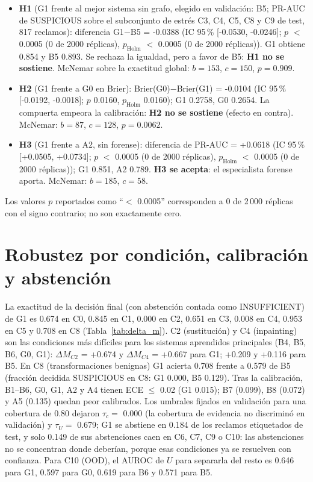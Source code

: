 \begin{itemize}
\item \textbf{H1} (G1 frente al mejor sistema sin grafo, elegido en validación: B5; PR-AUC de SUSPICIOUS sobre el subconjunto de estrés C3, C4, C5, C8 y C9 de test, 817 reclamos): diferencia G1$-$B5 = -0.0388 (IC 95\,\% [-0.0530, -0.0246]; $p$ $<$ 0.0005 (0 de 2000 réplicas), $p_{\mathrm{Holm}}$ $<$ 0.0005 (0 de 2000 réplicas)). G1 obtiene 0.854 y B5
0.893. Se rechaza la igualdad, pero a favor de B5: \textbf{H1 no se sostiene}. McNemar sobre
la exactitud global: $b=153$, $c=150$, $p=0.909$.
\item \textbf{H2} (G1 frente a G0 en Brier): Brier(G0)$-$Brier(G1) = -0.0104 (IC 95\,\% [-0.0192, -0.0018]; $p$ 0.0160, $p_{\mathrm{Holm}}$ 0.0160); G1 0.2758, G0
0.2654. La compuerta empeora la calibración: \textbf{H2 no se sostiene} (efecto en contra). McNemar:
$b=87$, $c=128$, $p=0.0062$.
\item \textbf{H3} (G1 frente a A2, sin forense): diferencia de PR-AUC = +0.0618 (IC 95\,\% [+0.0505, +0.0734]; $p$ $<$ 0.0005 (0 de 2000 réplicas), $p_{\mathrm{Holm}}$ $<$ 0.0005 (0 de 2000 réplicas)); G1 0.851, A2
0.789. \textbf{H3 se acepta}: el especialista forense aporta. McNemar: $b=185$, $c=58$.
\end{itemize}

Los valores $p$ reportados como ``$<$ 0.0005'' corresponden a 0 de 2\,000 réplicas con el signo contrario; no son exactamente cero.

\section{Robustez por condición, calibración y abstención}

La exactitud de la decisión final (con abstención contada como INSUFFICIENT) de G1 es 0.674 en C0,
0.845 en C1, 0.000 en C2, 0.651 en C3, 0.008 en C4,
0.953 en C5 y 0.708 en C8 (Tabla~\ref{tab:delta_m}). C2 (sustitución) y C4 (inpainting) son
las condiciones más difíciles para los sistemas aprendidos principales (B4, B5, B6, G0, G1): $\Delta M_{C2}$ = +0.674 y $\Delta M_{C4}$ = +0.667
para G1; +0.209 y +0.116 para B5. En C8 (transformaciones benignas) G1 acierta
0.708 frente a 0.579 de B5 (fracción decidida SUSPICIOUS en C8: G1
0.000, B5
0.129).
Tras la calibración, B1--B6, G0, G1, A2 y A4 tienen ECE $\leq$ 0.02 (G1 0.015); B7 (0.099), B8 (0.072) y A5 (0.135) quedan peor calibrados. Los umbrales fijados en validación para una cobertura
de 0.80 dejaron $\tau_c=$ 0.000 (la cobertura de evidencia no discriminó en validación) y $\tau_U=$
0.679; G1 se abstiene en 0.184 de los reclamos etiquetados de test, y solo
0.149 de sus abstenciones caen en C6, C7, C9 o C10: las abstenciones no se concentran
donde deberían, porque esas condiciones ya se resuelven con confianza. Para C10 (OOD), el AUROC de $U$ para separarla del resto
es 0.646 para G1, 0.597 para G0, 0.619 para B6 y 0.571 para B5.

